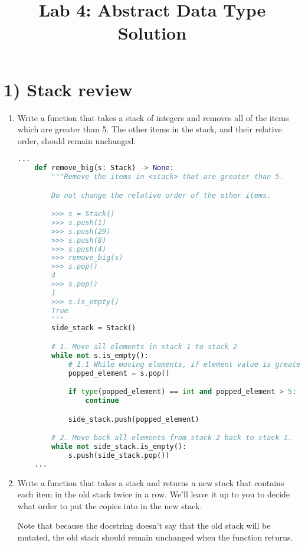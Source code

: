 \documentclass[12pt]{article}
\begin{document}
\title{Lab 4: Abstract Data Type Solution}
\date{}
\maketitle

\section*{1) Stack review}
\begin{enumerate}[1.]
    \item Write a function that takes a stack of integers and removes all of the items which are greater than 5.
    The other items in the stack, and their relative order, should remain unchanged.

    \begin{lstlisting}[language=Python,caption={task\_1\_q1\_solution.py},captionpos=b]
    ...
    def remove_big(s: Stack) -> None:
        """Remove the items in <stack> that are greater than 5.

        Do not change the relative order of the other items.

        >>> s = Stack()
        >>> s.push(1)
        >>> s.push(29)
        >>> s.push(8)
        >>> s.push(4)
        >>> remove_big(s)
        >>> s.pop()
        4
        >>> s.pop()
        1
        >>> s.is_empty()
        True
        """
        side_stack = Stack()

        # 1. Move all elements in stack 1 to stack 2
        while not s.is_empty():
            # 1.1 While moving elements, if element value is greater than 5, then pass
            popped_element = s.pop()

            if type(popped_element) == int and popped_element > 5:
                continue

            side_stack.push(popped_element)

        # 2. Move back all elements from stack 2 back to stack 1.
        while not side_stack.is_empty():
            s.push(side_stack.pop())
    ...
    \end{lstlisting}

    \item Write a function that takes a stack and returns a new stack that contains each item in the old stack twice in a row.
    We’ll leave it up to you to decide what order to put the copies into in the new stack.

    \bigskip

    Note that because the docstring doesn’t say that the old stack will be mutated,
    the old stack should remain unchanged when the function returns.


\end{enumerate}
\end{document}
